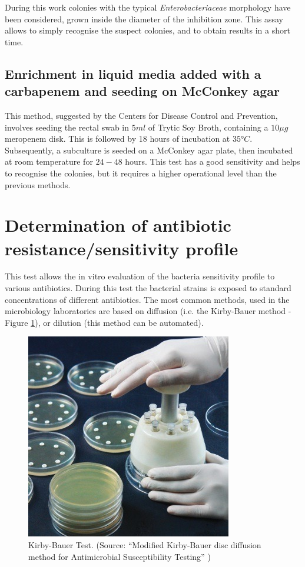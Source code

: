 \documentclass[11pt]{report}
\begin{document}
During this work colonies with the typical \emph{Enterobacteriaceae} morphology have been considered, grown inside the diameter of the inhibition zone.
This assay allows to simply recognise the suspect colonies, and to obtain results in a short time.

\subsection{Enrichment in liquid media added with a carbapenem and seeding on McConkey agar}

This method, suggested by the Centers for Disease Control and Prevention, involves seeding the rectal swab in $5ml$ of Trytic Soy Broth, containing a $10\mu g$ meropenem disk.
This is followed by 18 hours of incubation at $35°C$.
Subsequently, a subculture is seeded on a McConkey agar plate, then incubated at room temperature for $24-48$ hours.
This test has a good sensitivity and helps to recognise the colonies, but it requires a higher operational level than the previous methods.

\section{Determination of antibiotic resistance/sensitivity profile}
This test allows the in vitro evaluation of the bacteria sensitivity profile to various antibiotics.
During this test the bacterial strains is exposed to standard concentrations of different antibiotics.
The most common methods, used in the microbiology laboratories are based on diffusion (i.e. the Kirby-Bauer method - Figure \ref{kirbyBauer}), or dilution (this method can be automated).

\begin{figure}[htp]
\centering
\includegraphics[scale=0.800]{img/kirbyBauer.jpg}
\caption{Kirby-Bauer Test. 
(Source: ``Modified Kirby-Bauer disc diffusion method for Antimicrobial Susceptibility Testing'' \cite{kirbyBauer})}
\label{kirbyBauer}
\end{figure}
\end{document}

